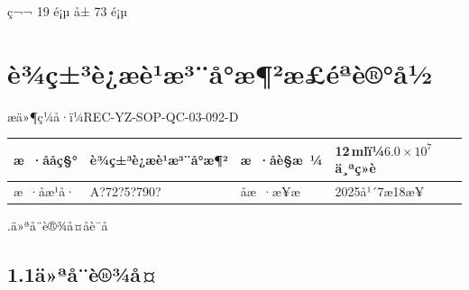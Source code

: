 \documentclass[UTF8,10pt,a4paper,fontset=fandol]{ctexart}
\newcommand{\fieldvalue}[1]{#1}
\newcommand{\handwritten}[1]{#1}
\begin{document}
\begin{center}
ç¬¬ 19 é¡µ å± 73 é¡µ
\end{center}

\newpage

\section*{è¾ç±³è¿æè¹æ³¨å°æ¶²æ£éªè®°å½}

\noindent æä»¶ç¼å·ï¼REC-YZ-SOP-QC-03-092-D

\begin{tabularx}{\textwidth}{|l|X|l|X|}
\hline
æ ·ååç§° &
\fieldvalue{è¾ç±³è¿æè¹æ³¨å°æ¶²} &
æ ·åè§æ ¼ &
\fieldvalue{12\,mlï¼$6.0\times10^{7}$ä¸ªç»è}
\\ \hline
æ ·åæ¹å· &
\fieldvalue{\handwritten{A?72?5?790?}} &
åæ ·æ¥æ &
\fieldvalue{\handwritten{2025å¹´7æ18æ¥}}
\\ \hline
\end{tabularx}

.\quad ä»ªå¨è®¾å¤åè¯å

\subsection*{1.1\quad ä»ªå¨è®¾å¤}
\end{document}
